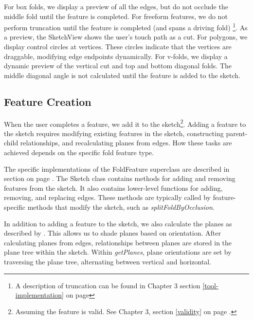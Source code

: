 For box folds, we display a preview of all the edges, but do not occlude
the middle fold until the feature is completed. For freeform features,
we do not perform truncation until the feature is completed (and spans a
driving fold) \footnote{A description of truncation can be found in
  Chapter 3 section \ref{tool-implementation}
   on page \pageref{tool-implementation}}.
As a preview, the SketchView shows the user's touch path as a cut. For
polygons, we display control circles at vertices. These circles indicate
that the vertices are draggable, modifying edge endpoints dynamically.
For v-folds, we display a dynamic preview of the vertical cut and top
and bottom diagonal folds. The middle diagonal angle is not calculated
until the feature is added to the sketch.

\subsection{Feature Creation}\label{feature-creation}

When the user completes a feature, we add it to the sketch\footnote{Assuming
  the feature is valid. See Chapter 3, section \ref{validity}
   on page \pageref{validity}.}. Adding a feature to
the sketch requires modifying existing features in the sketch,
constructing parent-child relationships, and recalculating planes from
edges. How these tasks are achieved depends on the specific fold feature
type.

The specific implementations of the FoldFeature superclass are described
in section  on page
\pageref{tool-implementation}. The Sketch class contains methods for
adding and removing features from the sketch. It also contains
lower-level functions for adding, removing, and replacing edges. These
methods are typically called by feature-specific methods that modify the
sketch, such as \emph{splitFoldByOcclusion}.

In addition to adding a feature to the sketch, we also calculate the
planes as described by \citet{mallen}. This allows us to shade planes
based on orientation. After calculating planes from edges, relationships
between planes are stored in the plane tree within the sketch. Within
\emph{getPlanes}, plane orientations are set by traversing the plane
tree, alternating between vertical and horizontal.
